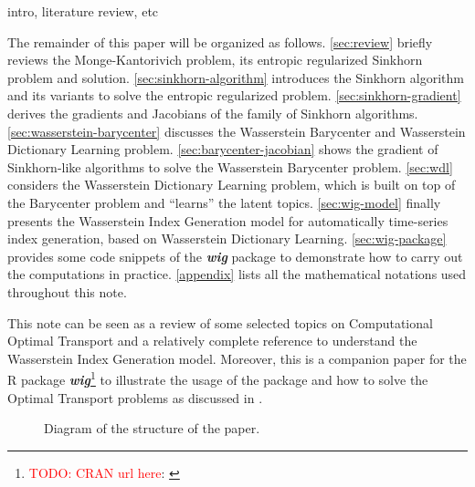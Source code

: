 

intro, literature review, etc

The remainder of this paper will be organized as follows.
\cref{sec:review} briefly reviews the Monge-Kantorivich problem, its entropic regularized Sinkhorn problem and solution.
\cref{sec:sinkhorn-algorithm} introduces the Sinkhorn algorithm and its variants to solve the entropic regularized problem.
\cref{sec:sinkhorn-gradient} derives the gradients and Jacobians of the family of Sinkhorn algorithms.
\cref{sec:wasserstein-barycenter} discusses the Wasserstein Barycenter and Wasserstein Dictionary Learning
problem.
\cref{sec:barycenter-jacobian} shows the gradient of Sinkhorn-like algorithms to solve the Wasserstein Barycenter problem.
\cref{sec:wdl} considers the Wasserstein Dictionary Learning problem,
which is built on top of the Barycenter problem and ``learns'' the latent topics.
\cref{sec:wig-model} finally presents the Wasserstein Index Generation model for automatically time-series index generation,
based on Wasserstein Dictionary Learning.
\cref{sec:wig-package} provides some code snippets of the \textbf{\textit{wig}} package to demonstrate how to carry out the
computations in practice.
\cref{appendix} lists all the mathematical notations used throughout this note.

This note can be seen as a review of some selected topics on Computational Optimal Transport
and a relatively complete reference to understand the Wasserstein Index Generation model.
Moreover, this is a companion paper for the R package \textbf{\textit{wig}}\footnote{
  \textcolor{red}{TODO: CRAN url here}: \url{}
} to illustrate the usage of the package and how to solve the Optimal Transport problems as discussed in
.


\begin{figure}%
  \centering
  \caption{Diagram of the structure of the paper.}\label{fig:article-diagram}
\end{figure}


